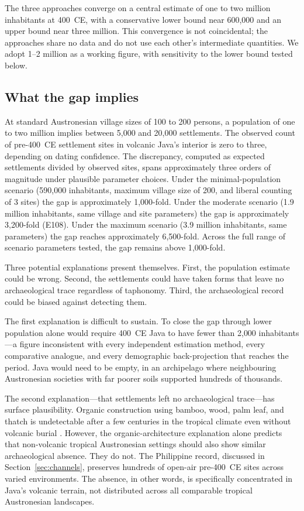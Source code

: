 \documentclass[12pt,a4paper]{article}
\begin{document}
The three approaches converge on a central estimate of one to two million inhabitants at 400~CE, with a conservative lower bound near 600{,}000 and an upper bound near three million. This convergence is not coincidental; the approaches share no data and do not use each other's intermediate quantities. We adopt 1--2 million as a working figure, with sensitivity to the lower bound tested below.

\subsection{What the gap implies}

At standard Austronesian village sizes of 100 to 200 persons, a population of one to two million implies between 5{,}000 and 20{,}000 settlements. The observed count of pre-400~CE settlement sites in volcanic Java's interior is zero to three, depending on dating confidence. The discrepancy, computed as expected settlements divided by observed sites, spans approximately three orders of magnitude under plausible parameter choices. Under the minimal-population scenario (590{,}000 inhabitants, maximum village size of 200, and liberal counting of 3 sites) the gap is approximately 1{,}000-fold. Under the moderate scenario (1{.}9 million inhabitants, same village and site parameters) the gap is approximately 3{,}200-fold (E108). Under the maximum scenario (3{.}9 million inhabitants, same parameters) the gap reaches approximately 6{,}500-fold. Across the full range of scenario parameters tested, the gap remains above 1{,}000-fold.

Three potential explanations present themselves. First, the population estimate could be wrong. Second, the settlements could have taken forms that leave no archaeological trace regardless of taphonomy. Third, the archaeological record could be biased against detecting them.

The first explanation is difficult to sustain. To close the gap through lower population alone would require 400~CE Java to have fewer than 2{,}000 inhabitants---a figure inconsistent with every independent estimation method, every comparative analogue, and every demographic back-projection that reaches the period. Java would need to be empty, in an archipelago where neighbouring Austronesian societies with far poorer soils supported hundreds of thousands.

The second explanation---that settlements left no archaeological trace---has surface plausibility. Organic construction using bamboo, wood, palm leaf, and thatch is undetectable after a few centuries in the tropical climate even without volcanic burial \citep{erasmus2005}. However, the organic-architecture explanation alone predicts that non-volcanic tropical Austronesian settings should also show similar archaeological absence. They do not. The Philippine record, discussed in Section~\ref{sec:channels}, preserves hundreds of open-air pre-400~CE sites across varied environments. The absence, in other words, is specifically concentrated in Java's volcanic terrain, not distributed across all comparable tropical Austronesian landscapes.
\end{document}
